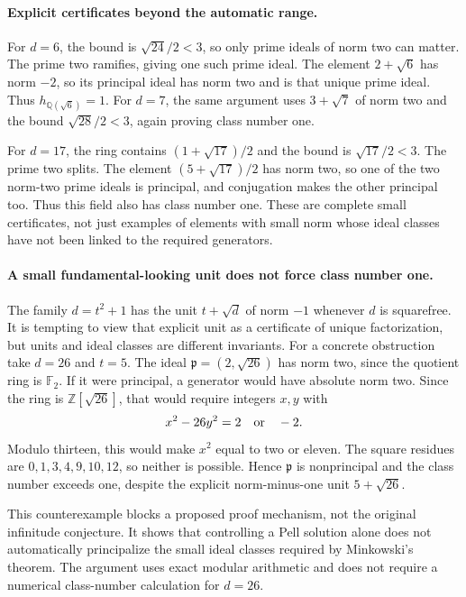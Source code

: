 \documentclass[11pt,a4paper]{article}
\begin{document}
\paragraph{Explicit certificates beyond the automatic range.}
For $d=6$, the bound is $\sqrt{24}/2<3$, so only prime ideals of
norm two can matter. The prime two ramifies, giving one such prime
ideal. The element $2+\sqrt6$ has norm $-2$, so its principal ideal
has norm two and is that unique prime ideal. Thus $h_{\mathbb Q(\sqrt6)}=1$.
For $d=7$, the same argument uses $3+\sqrt7$ of norm two and the
bound $\sqrt{28}/2<3$, again proving class number one.

For $d=17$, the ring contains $(1+\sqrt{17})/2$ and the bound is
$\sqrt{17}/2<3$. The prime two splits. The element
$(5+\sqrt{17})/2$ has norm two, so one of the two norm-two prime
ideals is principal, and conjugation makes the other principal too.
Thus this field also has class number one. These are complete small
certificates, not just examples of elements with small norm whose
ideal classes have not been linked to the required generators.

\paragraph{A small fundamental-looking unit does not force class number one.}
The family $d=t^2+1$ has the unit $t+\sqrt d$ of norm $-1$ whenever
$d$ is squarefree. It is tempting to view that explicit unit as a
certificate of unique factorization, but units and ideal classes are
different invariants. For a concrete obstruction take $d=26$ and $t=5$.
The ideal $\mathfrak p=(2,\sqrt{26})$ has norm two, since the quotient
ring is $\mathbb F_2$. If it were principal, a generator would have
absolute norm two. Since the ring is $\mathbb Z[\sqrt{26}]$, that
would require integers $x,y$ with
\[
                         x^2-26y^2=2\quad\hbox{or}\quad-2.
\]
Modulo thirteen, this would make $x^2$ equal to two or eleven. The
square residues are $0,1,3,4,9,10,12$, so neither is possible.
Hence $\mathfrak p$ is nonprincipal and the class number exceeds one,
despite the explicit norm-minus-one unit $5+\sqrt{26}$.

This counterexample blocks a proposed proof mechanism, not the original
infinitude conjecture. It shows that controlling a Pell solution alone
does not automatically principalize the small ideal classes required by
Minkowski's theorem. The argument uses exact modular arithmetic and
does not require a numerical class-number calculation for $d=26$.
\end{document}
